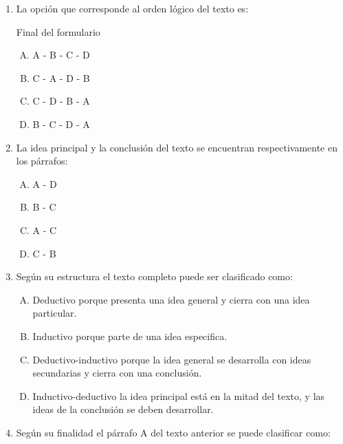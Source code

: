 \begin{enumerate}
\begin{flushright}
{\footnotesize Tomado de:\\
Isaac Asimov, Cien preguntas básicas sobre la ciencia.\\
 http://www.xtea.cat/~jgenover/ordtexto3.htm}
\end{flushright}



\item La opción que corresponde al orden lógico del texto es: \label{lit-15}


Final del formulario

\begin{enumerate}[(A)]
\item  A - B - C - D 
\item  C - A - D - B
\item  C - D - B - A
\item  B - C -  D -  A 
\end{enumerate}
\item La idea principal y la conclusión del texto se encuentran respectivamente en los párrafos: \label{lit-16}


\begin{enumerate}[(A)]
\item  A - D
\item  B - C 
\item  A - C
\item  C - B 
\end{enumerate}
\item  Según su estructura el texto completo puede ser clasificado como:\label{lit-17}


\begin{enumerate}[(A)]
\item  Deductivo porque presenta una idea general y cierra con una idea particular.
\item  Inductivo porque parte de una idea especifica.
\item  Deductivo-inductivo porque la idea general se desarrolla con ideas secundarias y cierra con una conclusión.
\item  Inductivo-deductivo la idea principal está en la mitad del texto, y las ideas de la conclusión se deben desarrollar.
\end{enumerate}
\item  Según su finalidad el párrafo A del texto anterior se puede clasificar como:\label{lit-18}


\end{enumerate}
